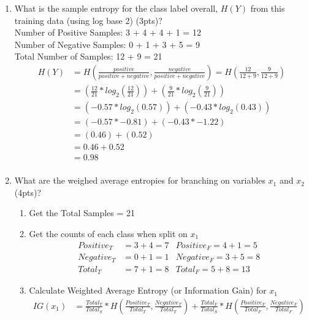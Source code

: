 \documentclass[12pt]{article}
\begin{document}
\begin{enumerate}
\begin{enumerate}
	\item What is the sample entropy for the class label overall, $H(Y)$ from this training data (using log base 2) (3pts)? \\
	\hfill \linebreak 
	Number of Positive Samples: 3 + 4 + 4 + 1 = 12 \\
	Number of Negative Samples: 0 + 1 + 3 + 5 = 9 \\ 
	Total Number of Samples: 12 + 9 = 21 \\
	\begin{equation*}
    	\begin{split}
    	    H(Y) & = H(\frac{positive}{positive+negative},\frac{negative}{positive+negative}) = H(\frac{12}{12+9},\frac{9}{12+9}) \\
    	    & = (\frac{12}{21} * log_2(\frac{12}{21})) + (\frac{9}{21} * log_2(\frac{9}{21})) \\
    	    & = (-0.57 * log_2(0.57)) + (-0.43 * log_2(0.43)) \\
    	    & = (-0.57 * -0.81) + (-0.43 * -1.22) \\
    	    & = (0.46) + (0.52) \\
    	    & = 0.46 + 0.52 \\
    	    & = 0.98 \\
    	\end{split}
	\end{equation*}
	\item What are the weighed average entropies for branching on variables $x_1$ and $x_2$ (4pts)?
	\begin{enumerate}
	    \item Get the Total Samples = 21
	    \item Get the counts of each class when split on $x_1$
	    \begin{align*}
	        Positive_T &= 3 + 4 = 7 & Positive_F = 4 + 1 = 5 \\
	        Negative_T &= 0 + 1 = 1 & Negative_F = 3 + 5 = 8 \\ 
	        Total_T &= 7 + 1 = 8 & Total_F = 5 + 8 = 13
	    \end{align*}
	    \item Calculate Weighted Average Entropy (or Information Gain) for $x_1$
	    \begin{equation*}
	        \begin{split}
	            IG(x_1) &= \frac{Total_T}{Total_S} * H(\frac{Positive_T}{Total_T},\frac{Negative_T}{Total_T}) + \frac{Total_F}{Total_S} * H(\frac{Positive_F}{Total_F},\frac{Negative_F}{Total_F}) \\

\end{split}
\end{equation*}
\end{enumerate}
\end{enumerate}
\end{enumerate}
\end{document}
